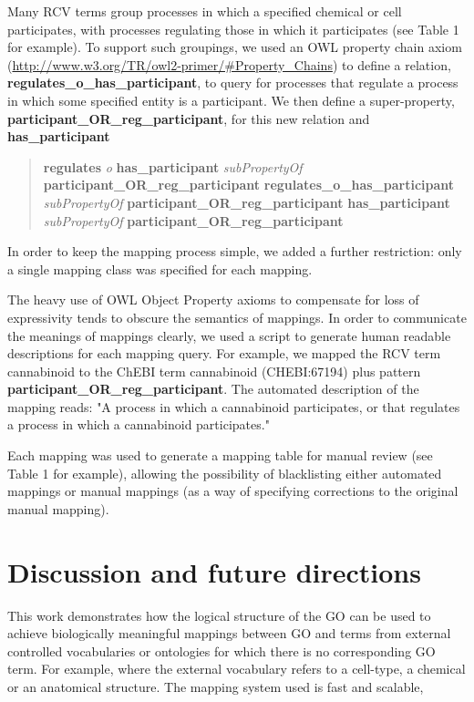 \documentclass[runningheads,a4paper]{llncs}
\begin{document}
{{Many RCV terms group processes in which a specified chemical or cell participates, with processes regulating those in which it participates (see Table 1 for example). To support such groupings, we used an OWL property chain axiom (\url{http://www.w3.org/TR/owl2-primer/#Property_Chains}) to define a relation, \textbf{regulates\_o\_has\_participant}, to query for processes that regulate a process in which some specified entity is a participant. We then define a super-property, \textbf{participant\_OR\_reg\_participant}, for this new relation and \textbf{has\_participant}

\begin{quote} %
\textbf{regulates} \textit{o} \textbf{has\_participant} \textit{subPropertyOf}
\textbf{participant\_OR\_reg\_participant}
\textbf{regulates\_o\_has\_participant} \textit{subPropertyOf} \textbf{participant\_OR\_reg\_participant}
\textbf{has\_participant} \textit{subPropertyOf} \textbf{participant\_OR\_reg\_participant}
\end{quote}

In order to keep the mapping process simple, we added a further restriction: only a single mapping class was specified for each mapping.

The heavy use of OWL Object Property axioms to compensate for loss of expressivity tends to obscure the semantics of mappings. In order to communicate the meanings of mappings clearly, we used a script to generate human readable descriptions for each mapping query.  For example, we mapped the RCV term cannabinoid to the ChEBI term cannabinoid (CHEBI:67194) plus pattern \textbf{participant\_OR\_reg\_participant}.  The automated description of the mapping reads:  "A process in which a cannabinoid participates, or that regulates a process in which a cannabinoid participates."

Each mapping was used to generate a mapping table for manual review (see Table 1 for example), allowing the possibility of blacklisting either automated mappings or manual mappings (as a way of specifying corrections to the original manual mapping).


\section{Discussion and future directions}

This work demonstrates how the logical structure of the GO can be used to achieve biologically meaningful mappings between GO and terms from external controlled vocabularies or ontologies for which there is no corresponding GO term.  For example, where the external vocabulary refers to a cell-type, a chemical or an anatomical structure.  The mapping system used is fast and scalable,  

}}
\end{document}
